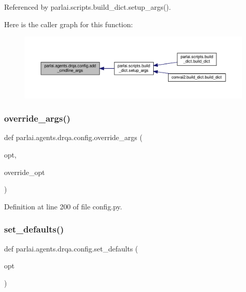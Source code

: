 Referenced by parlai.\+scripts.\+build\+\_\+dict.\+setup\+\_\+args().

Here is the caller graph for this function\+:
\nopagebreak
\begin{figure}[H]
\begin{center}
\leavevmode
\includegraphics[width=350pt]{namespaceparlai_1_1agents_1_1drqa_1_1config_a62fdd5554f1da6be0cba185271058320_icgraph}
\end{center}
\end{figure}
\mbox{\label{namespaceparlai_1_1agents_1_1drqa_1_1config_a0fd9c7cd1129e5b4a7c0315b9f03c31a}} 
\subsubsection{\texorpdfstring{override\+\_\+args()}{override\_args()}}
{\footnotesize\ttfamily def parlai.\+agents.\+drqa.\+config.\+override\+\_\+args (\begin{DoxyParamCaption}\item[{}]{opt,  }\item[{}]{override\+\_\+opt }\end{DoxyParamCaption})}



Definition at line 200 of file config.\+py.

\mbox{\label{namespaceparlai_1_1agents_1_1drqa_1_1config_a8cc825bafeff299794cba6e2a8b65da2}} 
\subsubsection{\texorpdfstring{set\+\_\+defaults()}{set\_defaults()}}
{\footnotesize\ttfamily def parlai.\+agents.\+drqa.\+config.\+set\+\_\+defaults (\begin{DoxyParamCaption}\item[{}]{opt }\end{DoxyParamCaption})}



